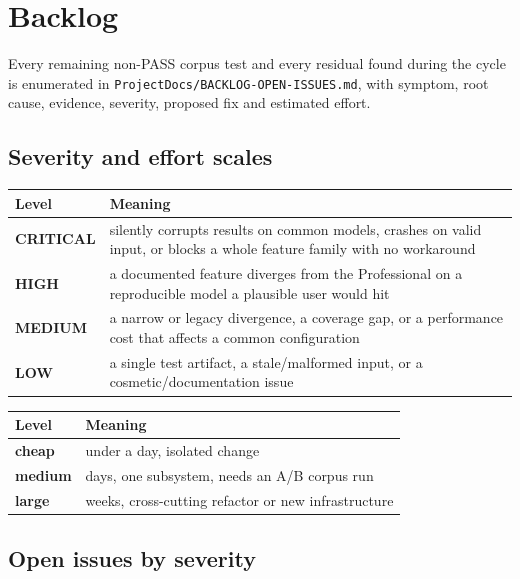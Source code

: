 \documentclass[11pt,a4paper]{report}
\newcommand{\code}[1]{\texttt{#1}}
\begin{document}
\chapter{Backlog}
\label{ch:backlog}

Every remaining non-PASS corpus test and every residual found during the cycle is
enumerated in \code{ProjectDocs/\allowbreak BACKLOG-OPEN-ISSUES.md}, with symptom, root
cause, evidence, severity, proposed fix and estimated effort.

\section{Severity and effort scales}

\begin{center}
\begin{tabular}{@{}L{2.2cm}L{11.4cm}@{}}
\toprule
Level & Meaning \\
\midrule
\textbf{CRITICAL} & silently corrupts results on common models, crashes on valid input, or blocks a whole feature family with no workaround \\
\textbf{HIGH} & a documented feature diverges from the Professional on a reproducible model a plausible user would hit \\
\textbf{MEDIUM} & a narrow or legacy divergence, a coverage gap, or a performance cost that affects a common configuration \\
\textbf{LOW} & a single test artifact, a stale/malformed input, or a cosmetic/documentation issue \\
\bottomrule
\end{tabular}
\end{center}

\begin{center}
\begin{tabular}{@{}L{2.2cm}L{11.4cm}@{}}
\toprule
Level & Meaning \\
\midrule
\textbf{cheap} & under a day, isolated change \\
\textbf{medium} & days, one subsystem, needs an A/B corpus run \\
\textbf{large} & weeks, cross-cutting refactor or new infrastructure \\
\bottomrule
\end{tabular}
\end{center}

\section{Open issues by severity}
\end{document}
